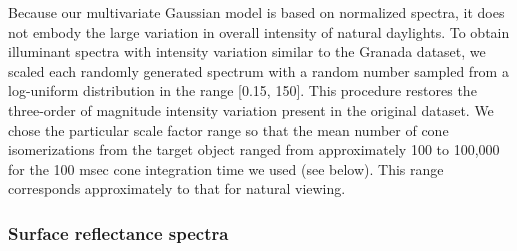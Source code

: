 \documentclass{jov}
\begin{document}
Because our multivariate Gaussian model is based on normalized spectra, it does not embody the large variation in overall intensity of natural daylights.
To obtain illuminant spectra with intensity variation similar to the Granada dataset, we scaled each randomly generated spectrum with a random number sampled from a log-uniform distribution in the range [0.15, 150].
This procedure restores the three-order of magnitude intensity variation present in the original dataset.
We chose the particular scale factor range so that the mean number of cone isomerizations from the target object ranged from approximately 100 to 100,000 for the 100 msec cone integration time we used (see below).
This range corresponds approximately to that for natural viewing.

\subsubsection{Surface reflectance spectra}
\end{document}
